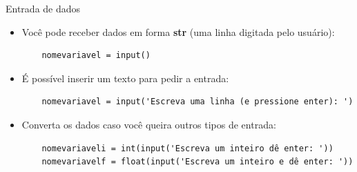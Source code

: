 \begin{frame}[containsverbatim]{Entrada de dados}	
	\begin{itemize}	
		\item Você pode receber dados em forma \textbf{str} (uma linha digitada pelo usuário):
		
\begin{verbatim}
	nomevariavel = input()
\end{verbatim}	
	
	\vfill
		
		\item É possível inserir um texto para pedir a entrada: 
		
\begin{verbatim}
	nomevariavel = input('Escreva uma linha (e pressione enter): ')
\end{verbatim}	

	\vfill 
	
		\item Converta os dados caso você queira outros tipos de entrada:
		
\begin{verbatim}
	nomevariaveli = int(input('Escreva um inteiro dê enter: '))
	nomevariavelf = float(input('Escreva um inteiro e dê enter: '))
\end{verbatim}		
		
	\end{itemize}	
  \end{frame}
 


